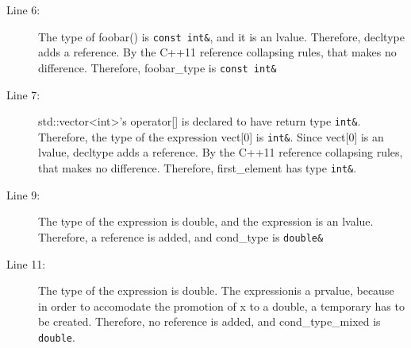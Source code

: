 \documentclass[a4paper,11pt,twoside]{book}
\begin{document}
\begin{itemize}
\begin{description}
		\item[Line 6:] The type of foobar() is \texttt{const int\&}, and it is an lvalue. Therefore, decltype adds a reference. By the C++11 reference collapsing rules, that makes no difference. Therefore, foobar\_type is \texttt{const int\&}
		
		\item[Line 7:] std::vector<int>'s operator[] is declared to have return type \texttt{int\&}. Therefore, the type of the expression vect[0] is \texttt{int\&}. Since vect[0] is an lvalue, decltype adds a reference. By the C++11 reference collapsing rules, that makes no difference. Therefore, first\_element has type \texttt{int\&}.  
		
		\item[Line 9:]  The type of the expression is double, and the expression is an lvalue. Therefore, a reference is added, and cond\_type is \texttt{double\&}
		
		\item[Line 11:] The type of the expression is double. The expressionis a prvalue, because in order to accomodate the promotion of x to a double, a temporary has to be created. Therefore, no reference is added, and cond\_type\_mixed is \texttt{double}.
	\end{description}

\end{itemize}
\end{document}
